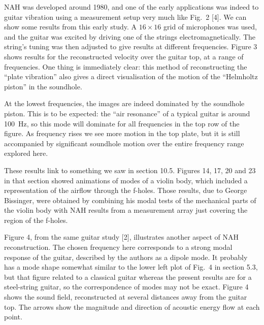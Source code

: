   NAH was developed around 1980, and one of the early applications was indeed 
  to guitar vibration using a measurement setup very much like Fig.\ 2 [4]. We 
  can show some results from this early study. A $16 \times 16$ grid of 
  microphones was used, and the guitar was excited by driving one of the 
  strings electromagnetically. The string’s tuning was then adjusted to give 
  results at different frequencies. Figure 3 shows results for the 
  reconstructed velocity over the guitar top, at a range of frequencies. One 
  thing is immediately clear: this method of reconstructing the “plate 
  vibration” also gives a direct visualisation of the motion of the “Helmholtz 
  piston” in the soundhole. 



  At the lowest frequencies, the images are indeed dominated by the soundhole 
  piston. This is to be expected: the “air resonance” of a typical guitar is 
  around 100~Hz, so this mode will dominate for all frequencies in the top row 
  of the figure. As frequency rises we see more motion in the top plate, but it 
  is still accompanied by significant soundhole motion over the entire 
  frequency range explored here. 

  These results link to something we saw in section 10.5. Figures 14, 17, 20 
  and 23 in that section showed animations of modes of a violin body, which 
  included a representation of the airflow through the f-holes. Those results, 
  due to George Bissinger, were obtained by combining his modal tests of the 
  mechanical parts of the violin body with NAH results from a measurement array 
  just covering the region of the f-holes. 

  Figure 4, from the same guitar study [2], illustrates another aspect of NAH 
  reconstruction. The chosen frequency here corresponds to a strong modal 
  response of the guitar, described by the authors as a dipole mode. It 
  probably has a mode shape somewhat similar to the lower left plot of Fig.\ 4 
  in section 5.3, but that figure related to a classical guitar whereas the 
  present results are for a steel-string guitar, so the correspondence of modes 
  may not be exact. Figure 4 shows the sound field, reconstructed at several 
  distances away from the guitar top. The arrows show the magnitude and 
  direction of acoustic energy flow at each point. 


